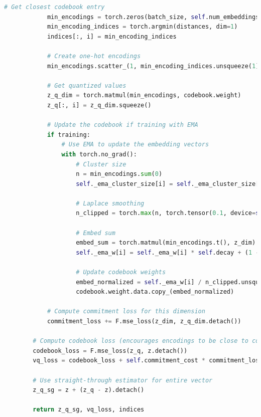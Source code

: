 \documentclass[12pt,openany]{article}
\theoremstyle{definition}
\theoremstyle{definition}
\theoremstyle{definition}
\begin{document}
\begin{lstlisting}[language=Python, caption=Vector Quantizer Implementation]
            # Get closest codebook entry
            min_encodings = torch.zeros(batch_size, self.num_embeddings, device=self.device)
            min_encoding_indices = torch.argmin(distances, dim=1)
            indices[:, i] = min_encoding_indices

            # Create one-hot encodings
            min_encodings.scatter_(1, min_encoding_indices.unsqueeze(1), 1)

            # Get quantized values
            z_q_dim = torch.matmul(min_encodings, codebook.weight)
            z_q[:, i] = z_q_dim.squeeze()

            # Update the codebook if training with EMA
            if training:
                # Use EMA to update the embedding vectors
                with torch.no_grad():
                    # Cluster size
                    n = min_encodings.sum(0)
                    self._ema_cluster_size[i] = self._ema_cluster_size[i] * self.decay + (1 - self.decay) * n

                    # Laplace smoothing
                    n_clipped = torch.max(n, torch.tensor(0.1, device=self.device))

                    # Embed sum
                    embed_sum = torch.matmul(min_encodings.t(), z_dim)
                    self._ema_w[i] = self._ema_w[i] * self.decay + (1 - self.decay) * embed_sum

                    # Update codebook weights
                    embed_normalized = self._ema_w[i] / n_clipped.unsqueeze(1)
                    codebook.weight.data.copy_(embed_normalized)

            # Compute commitment loss for this dimension
            commitment_loss += F.mse_loss(z_dim, z_q_dim.detach())

        # Compute codebook loss (encourages encodings to be close to codebook entries)
        codebook_loss = F.mse_loss(z_q, z.detach())
        vq_loss = codebook_loss + self.commitment_cost * commitment_loss

        # Use straight-through estimator for entire vector
        z_q_sg = z + (z_q - z).detach()

        return z_q_sg, vq_loss, indices
\end{lstlisting} 
\end{document}
